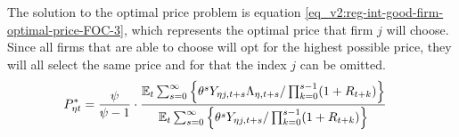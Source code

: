 \documentclass[../thesis.tex]{subfiles}
\begin{document}
\begin{comment}

Substitute \ref{eq_v2:reg-final-goods-firm-FOC} in \ref{eq_v2:reg-int-good-firm-optimal-price-FOC}:
\begin{alignat}{2}
	\E \sum_{s=0}^{\infty} \Bigg\{ \frac{\theta^s (\psi-1) Y_{\eta j,t+s}}{\prod_{k=0}^{s-1}(1+R_{t+k})} \Bigg\} &= \E \sum_{s=0}^{\infty} \Bigg\{ \frac{\theta^s \psi P_{\eta jt}^{-1} Y_{\eta j,t+s} \Lambda_{\eta, t+s}}{\prod_{k=0}^{s-1}(1+R_{t+k})}  \Bigg\} &\implies \nonumber \\
	(\psi-1) \E \sum_{s=0}^{\infty} \Bigg\{ \frac{\theta^s Y_{\eta j,t+s}}{\prod_{k=0}^{s-1}(1+R_{t+k})} \Bigg\} &= \psi P_{\eta jt}^{-1} \E \sum_{s=0}^{\infty} \Bigg\{ \frac{\theta^s Y_{\eta j,t+s} \Lambda_{\eta, t+s}}{\prod_{k=0}^{s-1}(1+R_{t+k})}  \Bigg\} &\implies \nonumber \\
	P_{\eta jt} \E \sum_{s=0}^{\infty} \Bigg\{ \frac{\theta^s Y_{\eta j,t+s}}{\prod_{k=0}^{s-1}(1+R_{t+k})} \Bigg\} &= \frac{\psi}{\psi-1} \E \sum_{s=0}^{\infty} \Bigg\{ \frac{\theta^s Y_{\eta j,t+s} \Lambda_{\eta, t+s}}{\prod_{k=0}^{s-1}(1+R_{t+k})}  \Bigg\} &\implies \nonumber
\end{alignat}

\vspace*{-1cm}

\begin{align}
	\label{eq_v2:reg-int-good-firm-optimal-price-FOC-2}
	P_{\eta jt}^{\ast} &= 
	\frac{\psi}{\psi-1} \cdot
	\frac{
		\E \sum_{s=0}^{\infty} \left\{ 
		\theta^s Y_{\eta j,t+s} \Lambda_{\eta, t+s} / \prod_{k=0}^{s-1}(1+R_{t+k}) \right\}} {\E \sum_{s=0}^{\infty} \left\{
		\theta^s Y_{\eta j,t+s} / \prod_{k=0}^{s-1}(1+R_{t+k}) \right\}}
\end{align}	
	
\end{comment}


The solution to the optimal price problem is equation \ref{eq_v2:reg-int-good-firm-optimal-price-FOC-3}, which represents the optimal price that firm $j$ will choose. Since all firms that are able to choose will opt for the highest possible price, they will all select the same price and for that the index $j$ can be omitted.
\begin{align}
	P_{\eta t}^{\ast} &= \frac{\psi}{\psi-1} \cdot \frac{{\mathbb{E}_{t}} \sum_{s=0}^{\infty} \left\{ \theta^s Y_{\eta j,t+s} \Lambda_{\eta, t+s} / \prod_{k=0}^{s-1}(1+R_{t+k}) \right\}}{{\mathbb{E}_{t}} \sum_{s=0}^{\infty} \left\{ \theta^s Y_{\eta j,t+s} / \prod_{k=0}^{s-1}(1+R_{t+k}) \right\}} \label{eq_v2:reg-int-good-firm-optimal-price-FOC-3}
\end{align}
\end{document}
